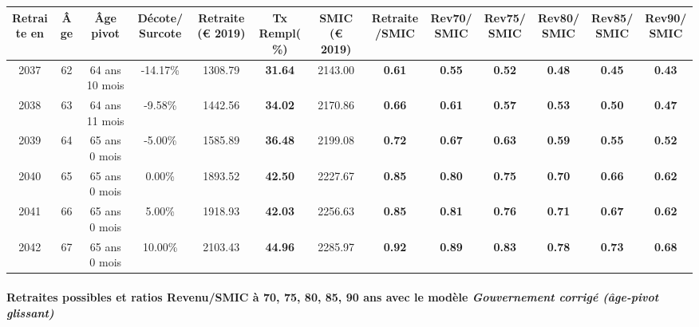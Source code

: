 { \scriptsize \begin{center} 
\begin{tabular}[htb]{|c|c||c|c||c|c||c||c|c|c|c|c|c|} 
\hline 
 Retraite en &  Âge &  Âge pivot &  Décote/Surcote &  Retraite (\euro{} 2019) &  Tx Rempl(\%) &  SMIC (\euro{} 2019) &  Retraite/SMIC &  Rev70/SMIC &  Rev75/SMIC &  Rev80/SMIC &  Rev85/SMIC &  Rev90/SMIC \\ 
\hline \hline 
 2037 &  62 &  64 ans 10 mois &  -14.17\% &  1308.79 &  {\bf 31.64} &  2143.00 &  {\bf {\color{red} 0.61}} &  {\bf {\color{red} 0.55}} &  {\bf {\color{red} 0.52}} &  {\bf {\color{red} 0.48}} &  {\bf {\color{red} 0.45}} &  {\bf {\color{red} 0.43}} \\ 
\hline 
 2038 &  63 &  64 ans 11 mois &  -9.58\% &  1442.56 &  {\bf 34.02} &  2170.86 &  {\bf {\color{red} 0.66}} &  {\bf {\color{red} 0.61}} &  {\bf {\color{red} 0.57}} &  {\bf {\color{red} 0.53}} &  {\bf {\color{red} 0.50}} &  {\bf {\color{red} 0.47}} \\ 
\hline 
 2039 &  64 &  65 ans 0 mois &  -5.00\% &  1585.89 &  {\bf 36.48} &  2199.08 &  {\bf {\color{red} 0.72}} &  {\bf {\color{red} 0.67}} &  {\bf {\color{red} 0.63}} &  {\bf {\color{red} 0.59}} &  {\bf {\color{red} 0.55}} &  {\bf {\color{red} 0.52}} \\ 
\hline 
 2040 &  65 &  65 ans 0 mois &  0.00\% &  1893.52 &  {\bf 42.50} &  2227.67 &  {\bf {\color{red} 0.85}} &  {\bf {\color{red} 0.80}} &  {\bf {\color{red} 0.75}} &  {\bf {\color{red} 0.70}} &  {\bf {\color{red} 0.66}} &  {\bf {\color{red} 0.62}} \\ 
\hline 
 2041 &  66 &  65 ans 0 mois &  5.00\% &  1918.93 &  {\bf 42.03} &  2256.63 &  {\bf {\color{red} 0.85}} &  {\bf {\color{red} 0.81}} &  {\bf {\color{red} 0.76}} &  {\bf {\color{red} 0.71}} &  {\bf {\color{red} 0.67}} &  {\bf {\color{red} 0.62}} \\ 
\hline 
 2042 &  67 &  65 ans 0 mois &  10.00\% &  2103.43 &  {\bf 44.96} &  2285.97 &  {\bf {\color{red} 0.92}} &  {\bf {\color{red} 0.89}} &  {\bf {\color{red} 0.83}} &  {\bf {\color{red} 0.78}} &  {\bf {\color{red} 0.73}} &  {\bf {\color{red} 0.68}} \\ 
\hline 
\hline 
\end{tabular} 
\end{center} } 
\paragraph{Retraites possibles et ratios Revenu/SMIC à 70, 75, 80, 85, 90 ans avec le modèle \emph{Gouvernement corrigé (âge-pivot glissant)}}  
 
